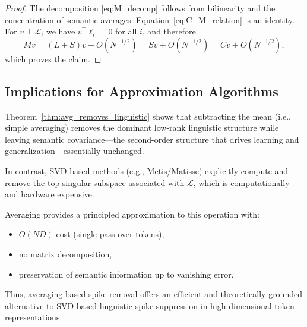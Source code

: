 \begin{proof}
The decomposition \eqref{eq:M_decomp} follows from bilinearity and the
concentration of semantic averages.
Equation~\eqref{eq:C_M_relation} is an identity.
For $v \perp \mathcal{L}$, we have $v^\top \ell_i = 0$ for all $i$, and therefore
\[
Mv
= (L + S)v + O(N^{-1/2})
= Sv + O(N^{-1/2})
= Cv + O(N^{-1/2}),
\]
which proves the claim.
\end{proof}

\subsection{Implications for Approximation Algorithms}

Theorem~\ref{thm:avg_removes_linguistic} shows that subtracting the mean
(i.e., simple averaging) removes the dominant low-rank linguistic structure
while leaving semantic covariance---the second-order structure that drives
learning and generalization---essentially unchanged.

In contrast, SVD-based methods (e.g., Metis/Matisse) explicitly compute and remove
the top singular subspace associated with $\mathcal{L}$, which is computationally
and hardware expensive.

Averaging provides a principled approximation to this operation with:
\begin{itemize}
    \item $O(ND)$ cost (single pass over tokens),
    \item no matrix decomposition,
    \item preservation of semantic information up to vanishing error.
\end{itemize}

Thus, averaging-based spike removal offers an efficient and theoretically grounded
alternative to SVD-based linguistic spike suppression in high-dimensional token
representations.
